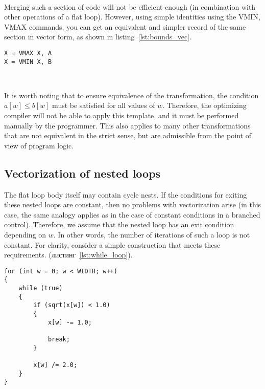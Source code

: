 \documentclass[
11pt,%
tightenlines,%
twoside,%
onecolumn,%
nofloats,%
nobibnotes,%
nofootinbib,%
superscriptaddress,%
noshowpacs,%
centertags]%
{revtex4}
\begin{document}
\

Merging such a section of code will not be efficient enough (in  combination with other operations of a flat loop).
However, using simple identities using the VMIN, VMAX commands, you can get an equivalent and simpler record of the same section in vector form, as shown in listing~\ref{lst:bounds_vec}.

\begin{lstlisting}[caption={Векторизованная форма ограничения значения величины с помощью нижней и верхней границ.},label={lst:bounds_vec}]
X = VMAX X, A
X = VMIN X, B
\end{lstlisting}

\

It is worth noting that to ensure equivalence of the transformation, the condition $a[w] \le b[w]$ must be satisfied for all values of $w$.
Therefore, the optimizing compiler will not be able to apply this template, and it must be performed manually by the programmer.
This also applies to many other transformations that are not equivalent in the strict sense, but are admissible from the point of view of program logic.

\subsection{Vectorization of nested loops}

The flat loop body itself may contain cycle nests.
If the conditions for exiting these nested loops are constant, then no problems with vectorization arise (in this case, the same analogy applies as in the case of constant conditions in a branched control).
Therefore, we assume that the nested loop has an exit condition depending on $w$.
In other words, the number of iterations of such a loop is not constant.
For clarity, consider a simple construction that meets these requirements. (листинг~\ref{lst:while_loop}).

\begin{lstlisting}[caption={Flat loop containing a loop with a non-constant number of iterations},label={lst:while_loop}]
for (int w = 0; w < WIDTH; w++)
{
    while (true)
    {
        if (sqrt(x[w]) < 1.0)
        {
            x[w] -= 1.0;

            break;
        }
            
        x[w] /= 2.0;
    }
}
\end{lstlisting}

\
\end{document}

